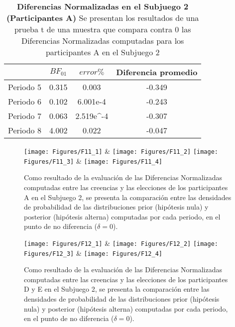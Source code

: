 \begin{table}[h]
\caption[Diferencias Normalizadas en el Subjuego 2; Participante A (Pruebas t de una muestra)]{\textbf{Diferencias Normalizadas en el Subjuego 2 (Participantes A)} Se presentan los resultados de una prueba t de una muestra que compara contra 0 las Diferencias Normalizadas computadas para los participantes A en el Subjuego 2}
\label{DN-S2-DyE-B}
\centering
\begin{tabular}{l | c c | c}
\toprule
\textbf{} & \textbf{$BF_{01}$} & \textbf{$error\%$} & \textbf{Diferencia promedio}\\
\midrule
Periodo 5 & 0.315 & 0.003 & -0.349\\
Periodo 6 & 0.102 & 6.001e-4 & -0.243\\
Periodo 7 & 0.063 & 2.519e^-4 & -0.307\\
Periodo 8 & 4.002 & 0.022 & -0.047\\
\bottomrule
\end{tabular}
\end{table}
  

\begin{figure}[hp]
\centering
\texttt{[image: Figures/F11\_1]} & \texttt{[image: Figures/F11\_2]} 
\texttt{[image: Figures/F11\_3]} & \texttt{[image: Figures/F11\_4]} 
\decoRule
\caption[Evaluación de las Diferencias Normalizadas entre creencias y elecciones en los participantes A en el Subjuego 2 (Factor de Bayes)]{Como resultado de la evaluación de las Diferencias Normalizadas computadas entre las creencias y las elecciones de los participantes A en el Subjuego 2, se presenta la comparación entre las densidades de probabilidad de las distribuciones prior (hipótesis nula) y posterior (hipótesis alterna) computadas por cada periodo, en el punto de no diferencia ($\delta = 0$).}
\label{fig:DN_S2_A}
\end{figure}  


\begin{figure}[hp]
\centering
\texttt{[image: Figures/F12\_1]} & \texttt{[image: Figures/F12\_2]} 
\texttt{[image: Figures/F12\_3]} & \texttt{[image: Figures/F12\_4]} 
\decoRule
\caption[Evaluación de las Diferencias Normalizadas entre creencias y elecciones en los participantes D y E en el Subjuego 2 (Factor de Bayes)]{Como resultado de la evaluación de las Diferencias Normalizadas computadas entre las creencias y las elecciones de los participantes D y E en el Subjuego 2, se presenta la comparación entre las densidades de probabilidad de las distribuciones prior (hipótesis nula) y posterior (hipótesis alterna) computadas por cada periodo, en el punto de no diferencia ($\delta = 0$).}
\label{fig:DN_S2_DyE}
\end{figure}  


